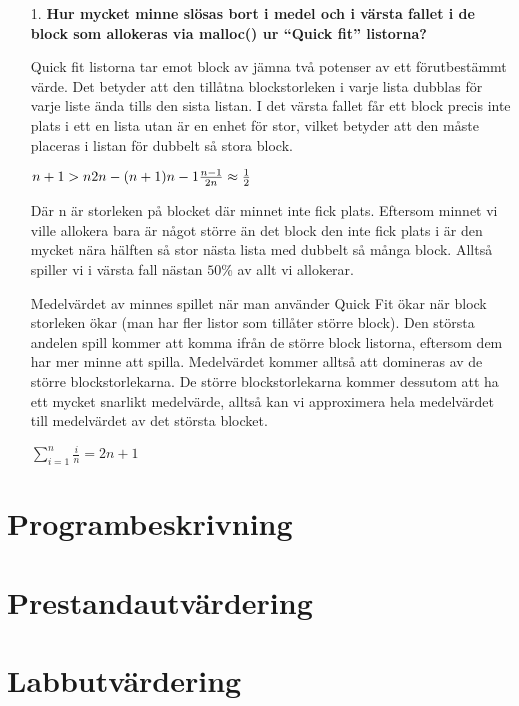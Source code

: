 \documentclass[a4paper,10pt,titlepage]{article}
\begin{document}
\begin{enumerate}
\item[1.] \textbf{\footnotesize Hur mycket minne slösas bort i medel och i värsta fallet i de block som allokeras via malloc() ur ``Quick fit'' listorna?}

Quick fit listorna tar emot block av jämna två potenser av ett
förutbestämmt värde. Det betyder att den tillåtna blockstorleken i
varje lista dubblas för varje liste ända tills den sista listan. I
det värsta fallet får ett block precis inte plats i ett en lista utan är en
enhet för stor, vilket betyder att den måste placeras i listan för dubbelt så
stora block.

\begin{math}
n+1 > n\\
2n - (n+1)\\
n-1\\
\frac{n-1}{2n} \approx \frac{1}{2}\\
\end{math}

Där n är storleken på blocket där minnet inte fick plats.
Eftersom minnet vi ville allokera bara är något större än det block den inte
fick plats i är den mycket nära hälften så stor nästa lista med dubbelt så många
block. Alltså spiller vi i värsta fall nästan $50\%$ av allt vi allokerar.

Medelvärdet av minnes spillet när man använder Quick Fit ökar när block
storleken ökar (man har fler listor som tillåter större block). Den största
andelen spill kommer att komma ifrån de större block listorna, eftersom dem har
mer minne att spilla. Medelvärdet kommer alltså att domineras av de större
blockstorlekarna. De större blockstorlekarna kommer dessutom att ha ett mycket
snarlikt medelvärde, alltså kan vi approximera hela medelvärdet till medelvärdet
av det största blocket.

\begin{math}
\sum^n_{i=1}\frac{i}{n} = 2n + 1
\end{math}

\end{enumerate}

\newpage
\section{Programbeskrivning}

\newpage
\section{Prestandautvärdering}




\newpage
\section{Labbutvärdering}
\end{document}
